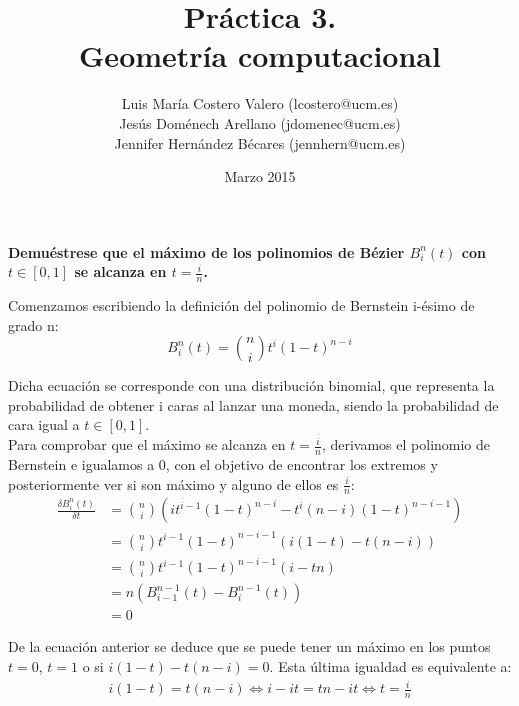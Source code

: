 \documentclass[12pt,a4paper]{article}
\title{Práctica 3. \\ Geometría computacional}
\author{Luis María Costero Valero (lcostero@ucm.es)\\ Jesús Doménech
  Arellano (jdomenec@ucm.es) \\ Jennifer Hernández Bécares (jennhern@ucm.es)}
\date{Marzo 2015}
\begin{document}
\maketitle

\textbf{Demuéstrese que el máximo de los polinomios de Bézier $B_{i}^{n}(t)$ con $t\in \left [ 0,1 \right ] $ se alcanza en $t=\frac{i}{n}$.}

Comenzamos escribiendo la definición del polinomio de Bernstein i-ésimo de grado n: \\
\begin{equation*}
  B_{i}^{n}(t) = \binom{n}{i} t^{i}(1-t)^{n-i}
\end{equation*}

Dicha ecuación se corresponde con una distribución binomial, que representa
la probabilidad de obtener i caras al lanzar una moneda, siendo la
probabilidad de cara igual a $t\in \left [ 0,1\right ] $.\\

Para comprobar que el máximo se alcanza en $t=\frac{i}{n}$, derivamos el
polinomio de Bernstein e igualamos a 0, con el objetivo de encontrar los
extremos y posteriormente ver si son máximo y alguno de ellos es
$\frac{i}{n}$:\\

\begin{align*}
  \frac{\delta B_i^n (t)}{\delta t} &= \binom{n}{i}(it^{i-1}(1-t)^{n-i}-t^{i}(n-i)(1-t)^{n-i-1}) \\
                                    &=
                                      \binom{n}{i}t^{i-1}(1-t)^{n-i-1}(i(1-t)-t(n-i))\\
                                    &=\binom{n}{i}t^{i-1}(1-t)^{n-i-1}(i-tn)\\
                                    &= n \left(B^{n-1}_{i-1}(t) - B^{n-1}_{i}(t)\right) \\
                                    &= 0
\end{align*}

De la ecuación anterior se deduce que se puede tener un máximo en los
puntos $t=0$, $t=1$ o si $i(1-t)-t(n-i)=0$. Esta última igualdad es
equivalente a:
\begin{align*}
  i(1-t)=t(n-i) \Longleftrightarrow i-it=tn-it \Longleftrightarrow t=\frac{i}{n}
\end{align*}
\end{document}
